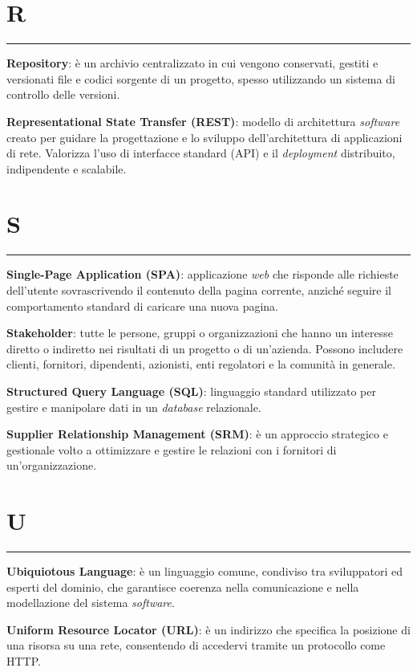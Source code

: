 \section*{R}
{\color{lightgray}\rule{\textwidth}{0.4pt}} %
\begin{glossaryitemize}
    \item \textbf{Repository}: è un archivio centralizzato in cui vengono conservati, gestiti e versionati file e codici sorgente di un progetto, spesso utilizzando un sistema di controllo delle versioni.
    \item \textbf{Representational State Transfer (REST)}: modello di architettura \textit{software} creato per guidare la progettazione e lo sviluppo dell’architettura di applicazioni di rete. Valorizza l’uso di interfacce standard (API) e il \textit{deployment} distribuito, indipendente e scalabile.
\end{glossaryitemize}

\section*{S}
{\color{lightgray}\rule{\textwidth}{0.4pt}} %
\begin{glossaryitemize}
    \item \textbf{Single-Page Application (SPA)}: applicazione \textit{web} che risponde alle richieste dell’utente sovrascrivendo il contenuto della pagina corrente, anziché seguire il comportamento standard di caricare una nuova pagina.
    \item \textbf{Stakeholder}: tutte le persone, gruppi o organizzazioni che hanno un interesse diretto o indiretto nei risultati di un progetto o di un'azienda. Possono includere clienti, fornitori, dipendenti, azionisti, enti regolatori e la comunità in generale.
    \item \textbf{Structured Query Language (SQL)}: linguaggio standard utilizzato per gestire e manipolare dati in un \textit{database} relazionale.
    \item \textbf{Supplier Relationship Management (SRM)}: è un approccio strategico e gestionale volto a ottimizzare e gestire le relazioni con i fornitori di un'organizzazione.
\end{glossaryitemize}

\section*{U}
{\color{lightgray}\rule{\textwidth}{0.4pt}} %
\begin{glossaryitemize}
    \item \textbf{Ubiquiotous Language}: è un linguaggio comune, condiviso tra sviluppatori ed esperti del dominio, che garantisce coerenza nella comunicazione e nella modellazione del sistema \textit{software}.
    \item \textbf{Uniform Resource Locator (URL)}: è un indirizzo che specifica la posizione di una risorsa su una rete, consentendo di accedervi tramite un protocollo come HTTP.
\end{glossaryitemize}

